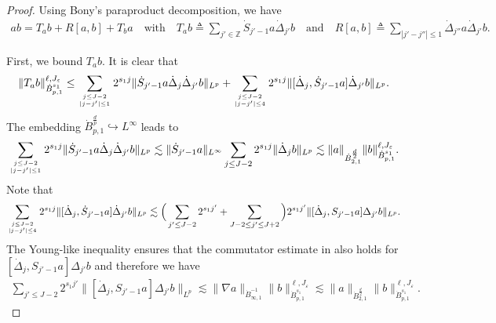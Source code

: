 \documentclass[10pt,a4paper]{amsart}
\newcommand\Z{\mathbb{Z}}
\def\dB{{\dot {B}}}
\def\ddj{\dot \Delta_j}
\def\ddjj{\dot \Delta_{j'}}
\begin{document}
\begin{proof}
Using Bony's paraproduct decomposition, we have
\begin{equation}\nonumber
\begin{aligned}
ab=T_{a}b+R[a,b]+T_{b}a\quad \mbox{with}\quad
T_{a}b\triangleq\sum_{j'\in \Z} \dot S_{j'-1}a \ddjj b\quad\mbox{and}\quad
R[a,b]\triangleq\sum_{|j'-j''|\leq 1} \dot\Delta_{j''} a \ddjj b.
\end{aligned}
\end{equation}

First, we bound $T_{a}b$. It is clear that
\begin{equation}\nonumber
\begin{aligned}
\|T_{a} b\|_{\dB_{p,1}^{s_1}}^{\ell,J_\varepsilon}
\leq
\sum_{j\leq J-2\atop |j-j'|\leq 1}2^{s_1 j} \|\dot S_{j'-1} a \ddj \ddjj b\|_{L^p}
+\sum_{j\leq J-2\atop |j-j'|\leq 4} 2^{s_1 j}\|[\ddj, \dot S_{j'-1} a] \ddjj b\|_{L^p}.
\end{aligned}
\end{equation}
The embedding $\dot B_{p,1}^{\frac{d}{p}}\hookrightarrow L^{\infty}$ leads to
\begin{equation}\nonumber
\begin{aligned}
\sum_{j\leq J-2\atop |j-j'|\leq 1} 2^{s_1j}\|\dot S_{j'-1} a \ddj \ddjj b\|_{L^p}
\lesssim
\|\dot S_{j'-1} a\|_{L^\infty}\sum_{j\leq J-2} 2^{s_1j} \|\ddj b\|_{L^p}
\lesssim
\|a\|_{\dB_{2,1}^{\frac{d}{2}}}\|b\|_{\dB_{p,1}^{s_1}}^{\ell,J_\varepsilon}.
\end{aligned}
\end{equation}
Note that
\begin{equation}\nonumber
\begin{aligned}
\sum_{j\leq J-2\atop |j-j'|\leq 4} 2^{s_1 j}\|[\ddj, \dot S_{j'-1} a] \ddjj b\|_{L^p}
\lesssim\Big(\sum\limits_{j'\leq J-2}2^{s_1j'}
+ \sum\limits_{J -2 \leq j'\leq J+2} \Big)2^{s_1j'}
\|[\ddj, S_{j'-1} a] \Delta_{j'} b\|_{L^p}.
\end{aligned}
\end{equation}
The Young-like inequality ensures that the commutator estimate in \cite[Lemma 2.97]{chemin} also holds for $[\ddj, S_{j'-1} a] \Delta_{j'} b$
and therefore we have
\begin{equation}\nonumber
\begin{aligned}
\sum\limits_{j'\leq J-2}2^{s_1j'}
\|[\ddj, S_{j'-1} a] \Delta_{j'} b\|_{L^p}
\lesssim
\|\nabla a\|_{\dB_{\infty,1}^{-1}}
\|b\|_{\dB_{p,1}^{s_1}}^{\ell,J_\varepsilon}
\lesssim
\|a\|_{\dB_{2,1}^{\frac{d}{2}}}
\|b\|_{\dB_{p,1}^{s_1}}^{\ell,J_\varepsilon}.

\end{aligned}
\end{equation}
\end{proof}
\end{document}
